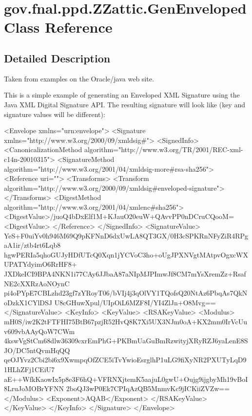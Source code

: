 \hypertarget{classgov_1_1fnal_1_1ppd_1_1ZZattic_1_1GenEnveloped}{\section{gov.\-fnal.\-ppd.\-Z\-Zattic.\-Gen\-Enveloped Class Reference}
\label{classgov_1_1fnal_1_1ppd_1_1ZZattic_1_1GenEnveloped}
}


\subsection{Detailed Description}
Taken from examples on the Oracle/java web site.

This is a simple example of generating an Enveloped X\-M\-L Signature using the Java X\-M\-L Digital Signature A\-P\-I. The resulting signature will look like (key and signature values will be different)\-:


\begin{DoxyPre}
 {\ttfamily 
<Envelope xmlns="urn:envelope">
 <Signature xmlns="http://www.w3.org/2000/09/xmldsig#">
   <SignedInfo>
     <CanonicalizationMethod algorithm="http://www.w3.org/TR/2001/REC-xml-c14n-20010315">
     <SignatureMethod algorithm="http://www.w3.org/2001/04/xmldsig-more#rsa-sha256">
     <Reference uri="">
       <Transforms>
         <Transform algorithm="http://www.w3.org/2000/09/xmldsig#enveloped-signature">
       </Transforms>
       <DigestMethod algorithm="http://www.w3.org/2001/04/xmlenc#sha256">
       <DigestValue>/juoQ4bDxElf1M+KJauO20euW+QAvvPP0nDCruCQooM=<DigestValue>
     </Reference>
   </SignedInfo>
   <SignatureValue>
     YeS+F0uiYv0h946M69Q9pKFNnD6dxUwLA8QT3GX/0H3cSPKRnNFyZiR4RPgaA1ir/ztb4rt6Lqb8
     hgwPERIa5qhoGUJyHDfUTcQ0Xqn1jYCVoC3ho+oUgJPXNVgtMAtpvOgxcWXUPATYdyimO6RrHF8+
     JXDkeICI9BPA4NKN1i77CAy6JJbaA87aNIpMJPImwJf8CM7mYsXremZz+RsafNE2cXXRzAoNOynC
     pi4oPYpE7CBLzhd23gf7zYRoyT06/bVIj4j3qOlVY1TQofsQ20NtAz6PbqAs7QkNoDzkX1CYlDSJ
     U8cGHuwXpul/UIpOiL6MZF8I/YI4ZlJn+O8Mvg==
   </SignatureValue>
   <KeyInfo>
     <KeyValue>
       <RSAKeyValue>
         <Modulus>
           mH0S/iw2K2tFTFHI75BtB67pzjR52HvQ8K7Xi5UX3NJm0oA+KX2mm0IrVcUuv609vbAAyQoW7CWm
           4kswVgStCm68dlw36309cxrEmPhG+PKBmUaGuBmRzwityjXRyRZJ6yaLenE8SJO/DC5ntQvmHqQQ
           qeOJYvz2Cbi2bi6x9XwmpqOfZCE5iTvYwioEsrglhP1uLG9fiXyNR2PXUTyLqD91HLhZFj1CEiU7
           aE++WfkKaowIx5p8e3F6hQ+VFRNXjtemK5aajuL0gwU+Oujg9ijgbyMh19vBoI8LruJoMOBrYFNN
           2boQJ3wP0Ek7CPIqAzQB5MnmvKc9jICKiiZVZw==
         </Modulus>
         <Exponent>AQAB</Exponent>
       </RSAKeyValue>
     </KeyValue>
   </KeyInfo>
 </Signature>
</Envelope>
 }
 \end{DoxyPre}


